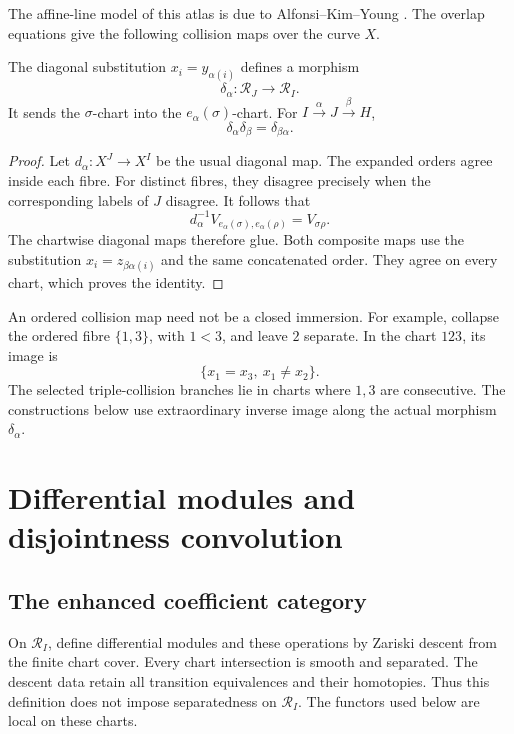 The affine-line model of this atlas is due to Alfonsi--Kim--Young
\cite[\S4.1]{S4aAlfonsiKimYoung}. The overlap equations give the following collision maps over the curve $X$.

\begin{proposition}\label{ogd:prop:collision}
The diagonal substitution \(x_i=y_{\alpha(i)}\) defines a morphism
\[
 \delta_\alpha:\mathscr R_J\longrightarrow \mathscr R_I.
\]
It sends the \(\sigma\)-chart into the \(e_\alpha(\sigma)\)-chart.
For \(I\xrightarrow\alpha J\xrightarrow\beta H\),
\[
 \delta_\alpha\delta_\beta=\delta_{\beta\alpha}.
\]
\end{proposition}
\begin{proof}
Let \(d_\alpha:X^J\to X^I\) be the usual diagonal map.
The expanded orders agree inside each fibre.
For distinct fibres, they disagree precisely when the corresponding labels of \(J\) disagree.
It follows that
\[
 d_\alpha^{-1}V_{e_\alpha(\sigma),e_\alpha(\rho)}=V_{\sigma\rho}.
\]
The chartwise diagonal maps therefore glue.
Both composite maps use the substitution \(x_i=z_{\beta\alpha(i)}\) and the same concatenated order.
They agree on every chart, which proves the identity.
\end{proof}

An ordered collision map need not be a closed immersion.
For example, collapse the ordered fibre \(\{1,3\}\), with \(1<3\), and leave \(2\) separate.
In the chart \(123\), its image is
\[
 \{x_1=x_3,\ x_1\ne x_2\}.
\]
The selected triple-collision branches lie in charts where \(1,3\) are consecutive.
The constructions below use extraordinary inverse image along the actual morphism \(\delta_\alpha\).

\section{Differential modules and disjointness convolution}\label{ogd:sec:category}

\subsection{The enhanced coefficient category}

On \(\mathscr R_I\), define differential modules and these operations by Zariski descent from the finite chart cover.
Every chart intersection is smooth and separated.
The descent data retain all transition equivalences and their homotopies.
Thus this definition does not impose separatedness on \(\mathscr R_I\).
The functors used below are local on these charts.

